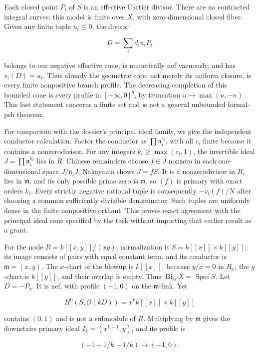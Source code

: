 \documentclass[11pt]{article}
\begin{document}
Each closed point \(P_i\) of \(S\) is an effective Cartier divisor. There are no contracted integral curves: this model is finite over \(X\), with zero-dimensional closed fiber. Given any finite tuple \(u_i\leq0\), the divisor

\[
D=\sum_i d_i u_i P_i
\]

belongs to our negative effective cone, is numerically nef vacuously, and has \(v_i(D)=u_i\). Thus already the geometric core, not merely its uniform closure, is every finite nonpositive branch profile. The decreasing completion of this bounded cone is every profile in \([-\infty,0]^q\), by truncation \(u\mapsto\max(u,-n)\). This last statement concerns a finite set and is not a general unbounded formal-psh theorem.

For comparison with the dossier's principal ideal family, we give the independent conductor calculation. Factor the conductor as \(\prod\mathfrak n_i^{c_i}\), with all \(c_i\) finite because it contains a nonzerodivisor. For any integers \(k_i\geq\max(c_i,1)\), the invertible ideal \(J=\prod\mathfrak n_i^{k_i}\) lies in \(R\). Chinese remainders choose \(f\in J\) nonzero in each one-dimensional space \(J/\mathfrak n_iJ\); Nakayama shows \(J=fS\). It is a nonzerodivisor in \(R\), lies in \(\mathfrak m\), and its only possible prime zero is \(\mathfrak m\), so \((f)\) is primary with exact orders \(k_i\). Every strictly negative rational tuple is consequently \(-v_i(f)/N\) after choosing a common sufficiently divisible denominator. Such tuples are uniformly dense in the finite nonpositive orthant. This proves exact agreement with the principal ideal cone specified by the task without importing that earlier result as a grant.

For the node \(R=k[[x,y]]/(xy)\), normalization is \(S=k[[x]]\times k[[y]]\); its image consists of pairs with equal constant term, and its conductor is \(\mathfrak m=(x,y)\). The \(x\)-chart of the blowup is \(k[[x]]\), because \(y/x=0\) in \(R_x\); the \(y\)-chart is \(k[[y]]\), and their overlap is empty. Thus \(\operatorname{Bl}_{\mathfrak m}X=\operatorname{Spec}S\). Let \(D=-P_x\). It is nef, with profile \((-1,0)\) on the \(\mathfrak m\)-link. Yet

\[
H^0(S,\mathcal O(kD))=x^kk[[x]]\times k[[y]]
\]

contains \((0,1)\) and is not a submodule of \(R\). Multiplying by \(\mathfrak m\) gives the downstairs primary ideal \(I_k=(x^{k+1},y)\), and its profile is

\[
(-1-1/k,-1/k)\longrightarrow(-1,0).
\]
\end{document}
